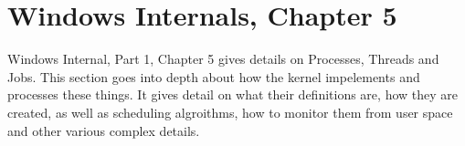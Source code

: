\documentclass[titlepage]{article}
\begin{document}
\section{Windows Internals, Chapter 5}
\begin{singlespace}
    \cite{windowsch5}Windows Internal, Part 1, Chapter 5 gives details on Processes, Threads and Jobs. This section goes into depth about how the kernel impelements and processes these things. It gives detail on what their definitions are, how they are created, as well as scheduling algroithms, how to monitor them from user space and other various complex details.
\end{singlespace}


\newpage


\end{document}
